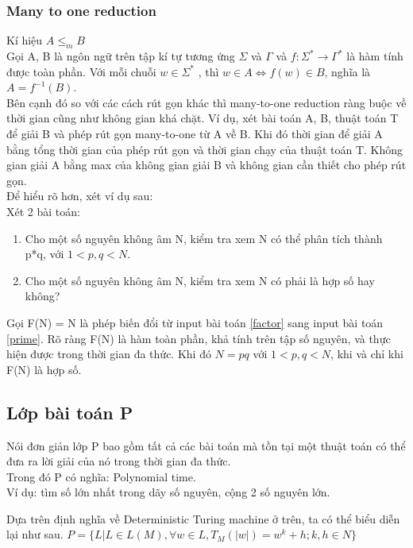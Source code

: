 \documentclass[a4paper 14pt]{article}
\begin{document}
			\subsubsection{Many to one reduction}
				Kí hiệu $A \leq_m B$\\
				Gọi A, B là ngôn ngữ trên tập kí tự tương ứng $\Sigma$ và $\Gamma$ và $f: \Sigma^* \to \Gamma^*$ là hàm tính được toàn phần. Với mỗi chuỗi $w \in \Sigma^*$ , thì $w \in A \Leftrightarrow f(w) \in B$, nghĩa là $A = f^{-1}(B)$.\\
				Bên cạnh đó so với các cách rút gọn khác thì many-to-one reduction ràng buộc về thời gian cũng như không gian khá chặt. Ví dụ, xét bài toán A, B, thuật toán T để giải B và phép rút gọn many-to-one từ A về B. Khi đó thời gian để giải A bằng tổng thời gian của phép rút gọn và thời gian chạy của thuật toán T. Không gian giải A bằng max của không gian giải B và không gian cần thiết cho phép rút gọn.\\
				Để hiểu rõ hơn, xét ví dụ sau:\\
				Xét 2 bài toán:
				\begin{enumerate}
					\item\label{factor} Cho một số nguyên không âm N, kiểm tra xem N có thể phân tích thành p*q, với $1 < p,q < N$.
					\item\label{prime} Cho một số nguyên không âm N, kiểm tra xem N có phải là hợp số hay không?
				\end{enumerate}
				Gọi F(N) = N là phép biến đổi từ input bài toán \ref{factor} sang input bài toán \ref{prime}. Rõ ràng F(N) là hàm toàn phần, khả tính trên tập số nguyên, và thực hiện được trong thời gian đa thức. Khi đó $N = pq$ với $1 < p,q < N$, khi và chỉ khi F(N) là hợp số.
		\subsection{Lớp bài toán P}
			Nói đơn giản lớp P bao gồm tất cả các bài toán mà tồn tại một thuật toán có thể đưa ra lời giải của nó trong thời gian đa thức.\\
			Trong đó P có nghĩa: Polynomial time.\\
			Ví dụ: tìm số lớn nhất trong dãy số nguyên, cộng 2 số nguyên lớn.
			
			Dựa trên định nghĩa về Deterministic Turing machine ở trên, ta có thể biểu diễn lại như sau.
			$P = \{L| L \in L(M), \forall w \in L, T_M(|w|) = w^k + h; k,h \in N\}$
			
\end{document}
